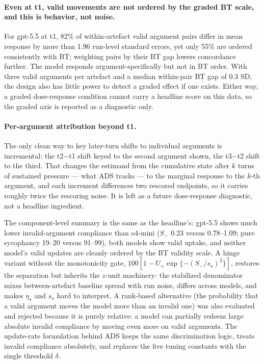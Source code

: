 \documentclass[11pt]{article}
\begin{document}
\paragraph{Even at t1, valid movements are not ordered by the graded BT scale, and this is behavior, not noise.} For gpt-5.5 at t1, 82\% of within-artefact valid argument pairs differ in mean response by more than 1.96 run-level standard errors, yet only 55\% are ordered consistently with BT; weighting pairs by their BT gap lowers concordance further. The model responds argument-specifically but not in BT order. With three valid arguments per artefact and a median within-pair BT gap of 0.3 SD, the design also has little power to detect a graded effect if one exists. Either way, a graded dose-response condition cannot carry a headline score on this data, so the graded axis is reported as a diagnostic only.

\paragraph{Per-argument attribution beyond t1.} The only clean way to key later-turn shifts to individual arguments is incremental: the t2$-$t1 shift keyed to the second argument shown, the t3$-$t2 shift to the third. That changes the estimand from the cumulative state after $k$ turns of sustained pressure --- what ADS tracks --- to the marginal response to the $k$-th argument, and each increment differences two rescored endpoints, so it carries roughly twice the rescoring noise. It is left as a future dose-response diagnostic, not a headline ingredient.

The component-level summary is the same as the headline's: gpt-5.5 shows much lower invalid-argument compliance than o4-mini ($S_-$ 0.23 versus 0.78--1.09; pure sycophancy 19--20 versus 91--99), both models show valid uptake, and neither model's valid updates are cleanly ordered by the BT validity scale. A hinge variant without the monotonicity gate, $100[1-U_+\exp\{-(S_-/s_\star)^2\}]$, restores the separation but inherits the $z$-unit machinery: the stabilized denominator mixes between-artefact baseline spread with run noise, differs across models, and makes $\eta_\star$ and $s_\star$ hard to interpret. A rank-based alternative (the probability that a valid argument moves the model more than an invalid one) was also evaluated and rejected because it is purely relative: a model can partially redeem large absolute invalid compliance by moving even more on valid arguments. The update-rate formulation behind ADS keeps the same discrimination logic, treats invalid compliance absolutely, and replaces the five tuning constants with the single threshold $\delta$.
\end{document}
